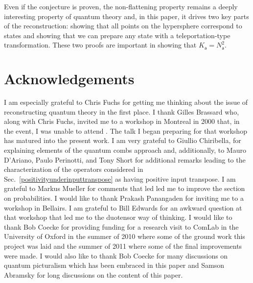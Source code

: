 \documentclass[10pt]{article}
\begin{document}
Even if the conjecture is proven, the non-flattening property remains a deeply interesting property of quantum theory and, in this paper, it drives two key parts of the reconstruction: showing that all points on the hypersphere correspond to states and showing that we can prepare any state with a teleportation-type transformation.  These two proofs are important in showing that $K_\mathsf{a}=N_\mathsf{a}^2$.








\newpage











\section*{Acknowledgements}

I am especially grateful to Chris Fuchs for getting me thinking about the issue of reconstructing quantum theory in the first place. I thank Gilles Brassard who, along with Chris Fuchs, invited me to a workshop in Montreal in 2000 that, in the event, I was unable to attend \cite{fuchs2009coming}.  The talk I began preparing for that workshop has matured into the present work.  I am very grateful to Giullio Chiribella, for explaining elements of the quantum combs approach \cite{chiribella2009theoretical} and, additionally, to Mauro D'Ariano, Paulo Perinotti, and Tony Short for additional remarks leading to the characterization of the operators considered in Sec.\ \ref{positivityunderinputtranspose} as having positive input transpose.  I am grateful to Markus Mueller for comments  that led led me to improve the section on probabilities.  I would like to thank Prakash Panangaden for inviting me to a workshop in Bellairs.  I am grateful to Bill Edwards for an awkward question at that workshop that led me to the duotensor way of thinking.  I would like to thank Bob Coecke for providing funding for a research visit to ComLab in the University of Oxford in the summer of 2010 where some of the ground work this project was laid and the summer of 2011 where some of the final improvements were made.   I would also like to thank Bob Coecke for many discussions on quantum picturalism which has been embraced in this paper and Samson Abramsky for long discussions on the content of this paper.
\end{document}
